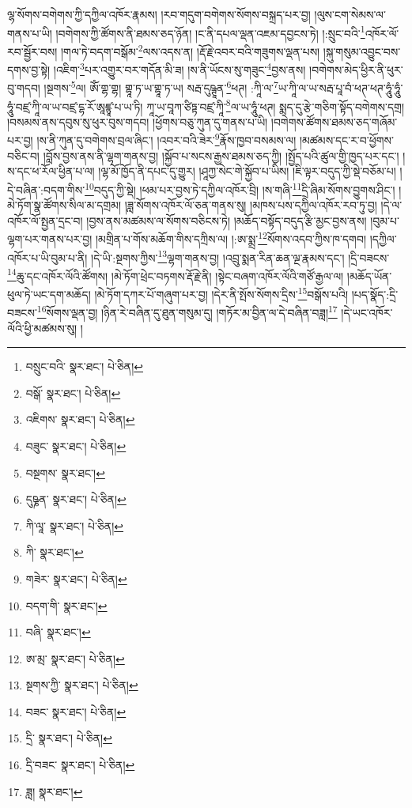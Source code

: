 ལྷ་སོགས་བགེགས་ཀྱི་དཀྱིལ་འཁོར་རྣམས། །རབ་གདུག་བགེགས་སོགས་བསྐྲད་པར་བྱ། །ལུས་ངག་སེམས་ལ་གནས་པ་ཡི། །བགེགས་ཀྱི་ཚོགས་ནི་ཐམས་ཅད་ཉོན། །ང་ནི་དཔལ་ལྡན་འཇམ་དབྱངས་ཏེ། །:སྲུང་བའི་\footnote{བསྲུང་བའི་  སྣར་ཐང་།  པེ་ཅིན། }འཁོར་ལོ་རབ་སྦྱོར་བས། །གལ་ཏེ་བདག་བསྒོམ་\footnote{བསྒོ་  སྣར་ཐང་།  པེ་ཅིན། }ལས་འདས་ན། །རྡོ་རྗེ་འབར་བའི་གཟུགས་ལྡན་པས། །སྐུ་གསུམ་འབྱུང་བས་དགས་བྱ་སྟེ། །འཇིག་\footnote{འཇིགས་  སྣར་ཐང་།  པེ་ཅིན། }པར་འགྱུར་བར་གདོན་མི་ཟ། །ས་ནི་ཡོངས་སུ་གཟུང་\footnote{བཟུང་  སྣར་ཐང་།  པེ་ཅིན། }བྱས་ནས། །བགེགས་མེད་ཕྱིར་ནི་ཕུར་བུ་གདབ། །སྔགས་\footnote{བསྔགས་  སྣར་ཐང་། }ལ། ཨོཾ་གྷ་གྷ། གྷཱ་ཏ་ཡ་གྷཱ་ཏ་ཡ། སརྦ་དུཥྚཱན་\footnote{དུཥྞན་  སྣར་ཐང་།  པེ་ཅིན། }ཕཊ། :ཀཱི་ལ་\footnote{ཀི་ལཱ་  སྣར་ཐང་།  པེ་ཅིན། }ཡ་ཀཱི་ལ་ཡ་སརྦ་པཱ་བཾ་ཕཊ་ཕཊ་ཧཱུཾ་ཧཱུཾ་ཧཱུཾ་བཛྲ་ཀཱི་ལ་ཡ་བཛྲ་དྷ་རོ་ཨཱཛྙཱ་པ་ཡ་ཏི། ཀཱ་ཡ་བཱཀ་ཙིཏྟ་བཛྲ་ཀཱི་\footnote{ཀི་  སྣར་ཐང་། }ལ་ཡ་ཧཱུཾ་ཕཊ། སྨད་དུ་རྩེ་གཅིག་སྟོད་བགེགས་དགྲ། །བསམས་ནས་དབུས་སུ་ཕུར་བུས་གདབ། །ཕྱོགས་བཅུ་ཀུན་དུ་གནས་པ་ཡི། །བགེགས་ཚོགས་ཐམས་ཅད་གཞོམ་པར་བྱ། །ས་ནི་ཀུན་དུ་བགེགས་བྲལ་ཞིང་། །འབར་བའི་ཟེར་\footnote{གཟེར་  སྣར་ཐང་།  པེ་ཅིན། }རྣོས་ཁྱབ་བསམས་ལ། །མཚམས་དང་ར་བ་ཕྱོགས་བཅིང་བ། །བློས་བྱས་ནས་ནི་ལྷག་གནས་བྱ། །སྐྱོབ་པ་སངས་རྒྱས་ཐམས་ཅད་ཀྱི། །སྤྱོད་པའི་ཚུལ་གྱི་ཁྱད་པར་དང་། །ས་དང་ཕ་རོལ་ཕྱིན་པ་ལ། །ལྷ་མོ་ཁྱོད་ནི་དཔང་དུ་གྱུར། །ཤཱཀྱ་སེང་གེ་སྐྱོབ་པ་ཡིས། །ཇི་ལྟར་བདུད་ཀྱི་སྡེ་བཅོམ་པ། །དེ་བཞིན་:བདག་གིས་\footnote{བདག་གི་  སྣར་ཐང་། }བདུད་ཀྱི་སྡེ། །ཕམ་པར་བྱས་ཏེ་དཀྱིལ་འཁོར་བྲི། །ས་གཞི་\footnote{བཞི་  སྣར་ཐང་། }དྲི་ཞིམ་སོགས་བྱུགས་ཤིང་། །མེ་ཏོག་སྣ་ཚོགས་སིལ་མ་དགྲམ། །ཟླ་སོགས་འཁོར་ལོ་ཅན་གནས་སུ། །མཁས་པས་དཀྱིལ་འཁོར་རབ་ཏུ་བྱ། །དེ་ལ་འཁོར་ལོ་སྤྱན་དྲང་བ། །བྱས་ནས་མཚམས་ལ་སོགས་བཅིངས་ཏེ། །མཆོད་བསྟོད་བདུད་རྩི་མྱང་བྱས་ནས། །བུམ་པ་ལྷག་པར་གནས་པར་བྱ། །མགྲིན་པ་གོས་མཆོག་གིས་དཀྲིས་ལ། །:ཨ་སྨྲ་\footnote{ཨ་མྲ་  སྣར་ཐང་།  པེ་ཅིན། }སོགས་འདབ་ཀྱིས་ཁ་དགབ། །དཀྱིལ་འཁོར་པ་ཡི་བུམ་པ་ནི། །དེ་ཡི་:སྔགས་ཀྱིས་\footnote{སྔགས་ཀྱི་  སྣར་ཐང་།  པེ་ཅིན། }ལྷག་གནས་བྱ། །འབྲུ་སྨན་རིན་ཆན་ལྔ་རྣམས་དང་། །དྲི་བཟངས་\footnote{བཟང་  སྣར་ཐང་།  པེ་ཅིན། }ཆུ་དང་འཁོར་ལོའི་ཚོགས། །མེ་ཏོག་ཕྲེང་བཏགས་རྡོ་རྗེ་ནི། །སྟེང་བཞག་འཁོར་ལོའི་གཙོ་རྒྱལ་ལ། །མཆོད་ཡོན་ཕུལ་ཏེ་ཡང་དག་མཆོད། །མེ་ཏོག་དཀར་པོ་གཞུག་པར་བྱ། །དེར་ནི་སྤོས་སོགས་དྲིས་\footnote{དྲི་  སྣར་ཐང་།  པེ་ཅིན། }བསྒོས་པའི། །པད་སྣོད་:དྲི་བཟངས་\footnote{དྲི་བཟང་  སྣར་ཐང་།  པེ་ཅིན། }སོགས་ལྡན་བྱ། །ཉིན་རེ་བཞིན་དུ་ཐུན་གསུམ་དུ། །གཏོར་མ་བྱིན་ལ་དེ་བཞིན་བཟླ།\footnote{ཟླ།  སྣར་ཐང་། } །དེ་ཡང་འཁོར་ལོའི་ཕྱི་མཚམས་སུ། །
